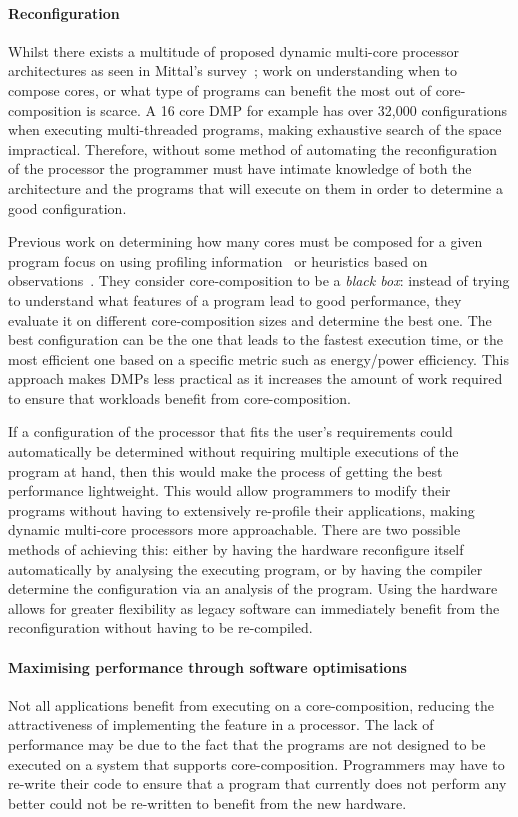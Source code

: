 \paragraph*{Reconfiguration}
Whilst there exists a multitude of proposed dynamic multi-core processor architectures as seen in Mittal's survey~\cite{MittalSurv2016}; work on understanding when to compose cores, or what type of programs can benefit the most out of core-composition is scarce.
A 16 core DMP for example has over 32,000 configurations when executing multi-threaded programs, making exhaustive search of the space impractical.
Therefore, without some method of automating the reconfiguration of the processor the programmer must have intimate knowledge of both the architecture and the programs that will execute on them in order to determine a good configuration.

Previous work on determining how many cores must be composed for a given program focus on using profiling information~\cite{pricopiSchedCoreComp2014} or heuristics based on observations~\cite{gulati2008multitaskingdmc}.
They consider core-composition to be a \textit{black box}: instead of trying to understand what features of a program lead to good performance, they evaluate it on different core-composition sizes and determine the best one.
The best configuration can be the one that leads to the fastest execution time, or the most efficient one based on a specific metric such as energy/power efficiency.
This approach makes DMPs less practical as it increases the amount of work required to ensure that workloads benefit from core-composition.

If a configuration of the processor that fits the user's requirements could automatically be determined without requiring multiple executions of the program at hand, then this would make the process of getting the best performance lightweight.
This would allow programmers to modify their programs without having to extensively re-profile their applications, making dynamic multi-core processors more approachable.
There are two possible methods of achieving this: either by having the hardware reconfigure itself automatically by analysing the executing program, or by having the compiler determine the configuration via an analysis of the program.
Using the hardware allows for greater flexibility as legacy software can immediately benefit from the reconfiguration without having to be re-compiled.

\paragraph*{Maximising performance through software optimisations}
Not all applications benefit from executing on a core-composition, reducing the attractiveness of implementing the feature in a processor.
The lack of performance may be due to the fact that the programs are not designed to be executed on a system that supports core-composition.
Programmers may have to re-write their code to ensure that a program that currently does not perform any better could not be re-written to benefit from the new hardware.


